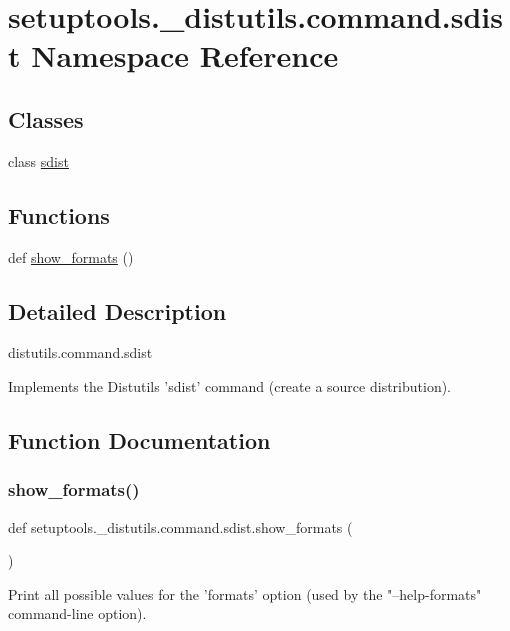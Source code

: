 \hypertarget{namespacesetuptools_1_1__distutils_1_1command_1_1sdist}{}\section{setuptools.\+\_\+distutils.\+command.\+sdist Namespace Reference}
\label{namespacesetuptools_1_1__distutils_1_1command_1_1sdist}
\subsection*{Classes}
\begin{DoxyCompactItemize}
\item 
class \hyperlink{classsetuptools_1_1__distutils_1_1command_1_1sdist_1_1sdist}{sdist}
\end{DoxyCompactItemize}
\subsection*{Functions}
\begin{DoxyCompactItemize}
\item 
def \hyperlink{namespacesetuptools_1_1__distutils_1_1command_1_1sdist_a7cd96b13541ba2a11287ab5758b58567}{show\+\_\+formats} ()
\end{DoxyCompactItemize}


\subsection{Detailed Description}
\begin{DoxyVerb}distutils.command.sdist

Implements the Distutils 'sdist' command (create a source distribution).\end{DoxyVerb}
 

\subsection{Function Documentation}
\mbox{\label{namespacesetuptools_1_1__distutils_1_1command_1_1sdist_a7cd96b13541ba2a11287ab5758b58567}} 
\subsubsection{\texorpdfstring{show\+\_\+formats()}{show\_formats()}}
{\footnotesize\ttfamily def setuptools.\+\_\+distutils.\+command.\+sdist.\+show\+\_\+formats (\begin{DoxyParamCaption}{ }\end{DoxyParamCaption})}

\begin{DoxyVerb}Print all possible values for the 'formats' option (used by
the "--help-formats" command-line option).
\end{DoxyVerb}
 